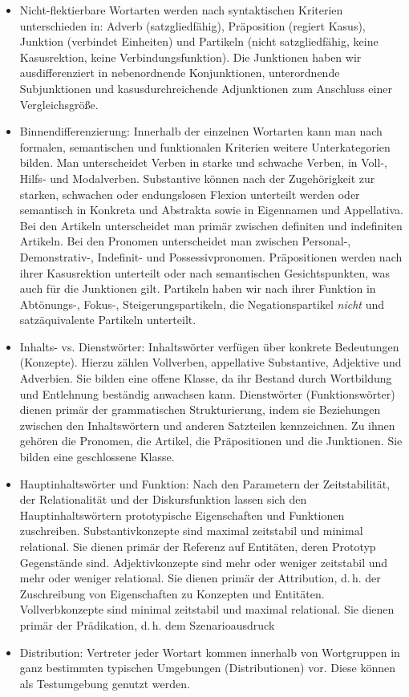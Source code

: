 \begin{itemize}
\item Nicht-flektierbare Wortarten werden nach syntaktischen Kriterien unterschieden in: Adverb (satzgliedfähig), Präposition (regiert Kasus), Junktion (verbindet Einheiten) und Partikeln (nicht satzgliedfähig, keine Kasusrektion, keine Verbindungsfunktion). Die Junktionen haben wir ausdifferenziert in nebenordnende Konjunktionen, unterordnende Subjunktionen und kasusdurchreichende Adjunktionen zum Anschluss einer Vergleichsgröße.  

\item Binnendifferenzierung: Innerhalb der einzelnen Wortarten kann man nach formalen, semantischen und funktionalen Kriterien weitere Unterkategorien bilden. Man unterscheidet Verben in starke und schwache Verben, in Voll-, Hilfs- und Modalverben. Substantive können nach der Zugehörigkeit zur starken, schwachen oder endungslosen Flexion unterteilt werden oder semantisch in Konkreta und Abstrakta sowie in Eigennamen und Appellativa. Bei den Artikeln unterscheidet man primär zwischen definiten und indefiniten Artikeln. Bei den Pronomen unterscheidet man  zwischen Personal-, Demonstrativ-, Indefinit- und Possessivpronomen. Präpositionen werden nach ihrer Kasusrektion unterteilt oder nach semantischen Gesichtspunkten, was auch für die Junktionen gilt. Partikeln haben wir nach ihrer Funktion in Abtönungs-, Fokus-, Steigerungspartikeln, die Negationspartikel \textit{nicht} und satzäquivalente Partikeln unterteilt.  

\item Inhalts- vs. Dienstwörter: Inhaltswörter verfügen über konkrete Bedeutungen (Konzepte). Hierzu zählen Vollverben, appellative Substantive, Adjektive und Adverbien. Sie bilden eine offene Klasse, da ihr Bestand durch Wortbildung und Entlehnung beständig anwachsen kann. Dienstwörter (Funktionswörter) dienen primär der grammatischen Strukturierung, indem sie Beziehungen zwischen den Inhaltswörtern und anderen Satzteilen kennzeichnen. Zu ihnen gehören die Pronomen, die Artikel, die Präpositionen und die Junktionen. Sie bilden eine geschlossene Klasse.   

\item Hauptinhaltswörter und Funktion: Nach den Parametern der Zeitstabilität, der Relationalität und der Diskursfunktion lassen sich den Hauptinhaltswörtern prototypische Eigenschaften und Funktionen zuschreiben. Substantivkonzepte sind maximal zeitstabil und minimal relational. Sie dienen primär der Referenz auf Entitäten, deren Prototyp Gegenstände sind. Adjektivkonzepte sind mehr oder weniger zeitstabil und mehr oder weniger relational. Sie dienen primär der Attribution, d.\,h. der Zuschreibung von Eigenschaften zu Konzepten und Entitäten. Vollverbkonzepte sind minimal zeitstabil und maximal relational. Sie dienen primär der Prädikation, d.\,h. dem Szenarioausdruck

\item Distribution: Vertreter jeder Wortart kommen innerhalb von Wortgruppen in ganz bestimmten typischen Umgebungen (Distributionen) vor. Diese können als Testumgebung genutzt werden.

\end{itemize}

